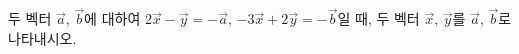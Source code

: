두 벡터 $\vec{a}$, $\vec{b}$에 대하여 $2\vec{x}-\vec{y}=-\vec{a}$, $-3\vec{x}+2\vec{y}=-\vec{b}$일 때, 두 벡터 $\vec{x}$, $\vec{y}$를 $\vec{a}$, $\vec{b}$로 나타내시오.

